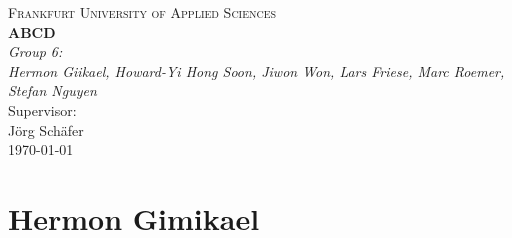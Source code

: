 \documentclass{article}
\begin{document}
\begin{titlepage}
    \centering
    \vspace*{0cm}
    {\scshape\Large Frankfurt University of Applied Sciences}\\[3cm]
    {\huge\bfseries ABCD}\\[8cm]
    {\Large\itshape Group 6:}\\
    {\Large\itshape Hermon Giikael, Howard-Yi Hong Soon, Jiwon Won, Lars Friese, Marc Roemer, Stefan Nguyen}\\[4cm]
    Supervisor:\\
    Jörg Schäfer\\[3cm]
    {\large \today}
\end{titlepage}

\tableofcontents
\newpage

\section{Hermon Gimikael}
\end{document}
